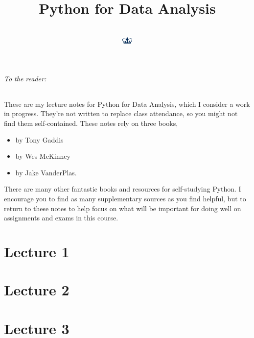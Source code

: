 \documentclass[11pt]{article}
\title{Python for Data Analysis \\ \scalebox{0.62}{Lecture Notes}}
\date{}
\author{\scalebox{0.81}{\link{https://github.com/alexanderthclark}{\instructor}} \\
	{\includegraphics[width = 0.51cm]{crown_dark.png}} \\
  	{\scalebox{0.73}{\centering\emph{Columbia University SPS}}} }
\begin{document}
\maketitle


\paragraph{To the reader:} These are my lecture notes for Python for Data Analysis, which I consider a work in progress. They're not written to replace class attendance, so you might not find them self-contained. These notes rely on three books,
\begin{itemize}
    \item \textit{} by Tony Gaddis
    \item \textit{} by Wes McKinney
    \item \textit{} by Jake VanderPlas.
\end{itemize}
There are many other fantastic books and resources for self-studying Python. I encourage you to find as many supplementary sources as you find helpful, but to return to these notes to help focus on what will be important for doing well on assignments and exams in this course.  

\tableofcontents

\part{Lecture 1}

    

\part{Lecture 2}

    

\part{Lecture 3}

    
\end{document}
